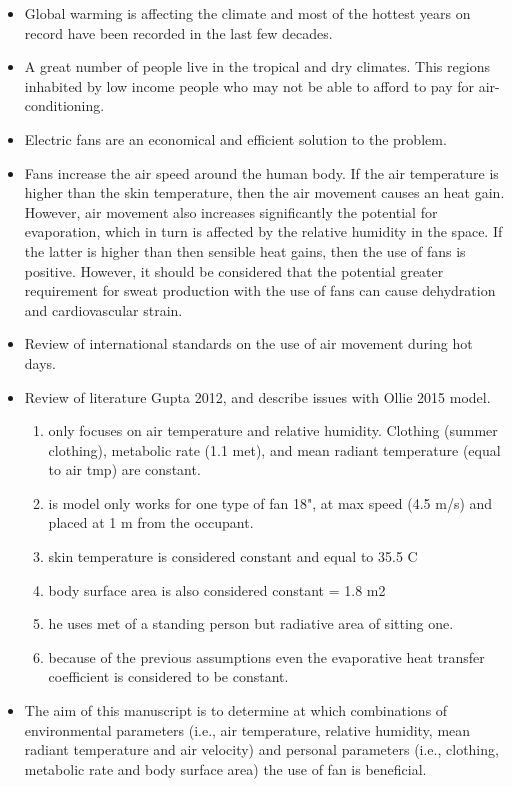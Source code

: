 \begin{itemize}
    \item Global warming is affecting the climate and most of the hottest years on record have been recorded in the last few decades.
    \item A great number of people live in the tropical and dry climates.
    This regions inhabited by low income people who may not be able to afford to pay for air-conditioning.
    \item Electric fans are an economical and efficient solution to the problem.
    \item Fans increase the air speed around the human body.
    If the air temperature is higher than the skin temperature, then the air movement causes an heat gain.
    However, air movement also increases significantly the potential for evaporation, which in turn is affected by the relative humidity in the space.
    If the latter is higher than then sensible heat gains, then the use of fans is positive.
    However, it should be considered that the potential greater requirement for sweat production with the use of fans can cause dehydration and cardiovascular strain.
    \item Review of international standards on the use of air movement during hot days.
    \item Review of literature Gupta 2012, and describe issues with Ollie 2015 model.
    \begin{enumerate}
        \item only focuses on air temperature and relative humidity. Clothing (summer clothing), metabolic rate (1.1 met), and mean radiant temperature (equal to air tmp) are constant.
        \item is model only works for one type of fan 18", at max speed (4.5 m/s) and placed at 1 m from the occupant.
        \item skin temperature is considered constant and equal to 35.5 C
        \item body surface area is also considered constant = 1.8 m2
        \item he uses met of a standing person but radiative area of sitting one.
        \item because of the previous assumptions even the evaporative heat transfer coefficient is considered to be constant.
    \end{enumerate}
    \item The aim of this manuscript is to determine at which combinations of environmental parameters (i.e., air temperature, relative humidity, mean radiant temperature and air velocity) and personal parameters (i.e., clothing, metabolic rate and body surface area) the use of fan is beneficial.

\end{itemize}
